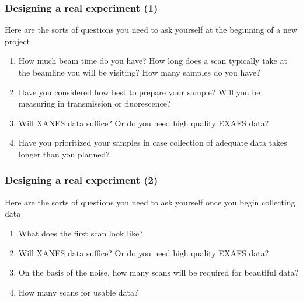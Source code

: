 \documentclass[10pt, xcolor=x11names, compress]{beamer}
\begin{document}
\begin{frame}
  \frametitle{Designing a real experiment (1)}
  \begin{block}{Here are the sorts of questions you need to ask
      yourself at the beginning of a new project}
    \begin{enumerate}
    \item How much beam time do you have?  How long does a scan
      typically take at the beamline you will be visiting?  How
      many samples do you have?
    \item Have you considered how best to prepare your sample?  Will
      you be measuring in transmission or fluorescence?
    \item Will XANES data suffice?  Or do you need high quality EXAFS
      data?
    \item Have you prioritized your samples in case collection of
      adequate data takes longer than you planned?
    \end{enumerate}
  \end{block}
\end{frame}

\begin{frame}
  \frametitle{Designing a real experiment (2)}
  \begin{exampleblock}{Here are the sorts of questions you need to ask
      yourself once you begin collecting data}
    \begin{enumerate}
    \item What does the first scan look like?
    \item Will XANES data suffice?  Or do you need high quality EXAFS
      data?
    \item On the basis of the noise, how many scans will be required
      for beautiful data?
    \item How many scans for usable data?
    \end{enumerate}
  \end{exampleblock}
\end{frame}
\end{document}

